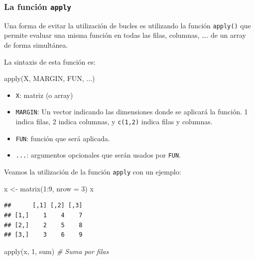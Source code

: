 \documentclass[
]{book}
\newenvironment{Shaded}{\begin{snugshade}}{\end{snugshade}}
\newcommand{\AttributeTok}[1]{\textcolor[rgb]{0.77,0.63,0.00}{#1}}
\newcommand{\CommentTok}[1]{\textcolor[rgb]{0.56,0.35,0.01}{\textit{#1}}}
\newcommand{\DecValTok}[1]{\textcolor[rgb]{0.00,0.00,0.81}{#1}}
\newcommand{\FunctionTok}[1]{\textcolor[rgb]{0.00,0.00,0.00}{#1}}
\newcommand{\NormalTok}[1]{#1}
\newcommand{\OtherTok}[1]{\textcolor[rgb]{0.56,0.35,0.01}{#1}}
\newcommand{\SpecialCharTok}[1]{\textcolor[rgb]{0.00,0.00,0.00}{#1}}
\providecommand{\tightlist}{%
  \setlength{\itemsep}{0pt}\setlength{\parskip}{0pt}}
\theoremstyle{break}
\begin{document}
\hypertarget{la-funciuxf3n-apply}{%
\subsubsection{\texorpdfstring{La función \texttt{apply}}{La función apply}}\label{la-funciuxf3n-apply}}

Una forma de evitar la
utilización de bucles es utilizando la función \texttt{apply()} que permite
evaluar una misma función en todas las filas, columnas, \ldots. de un array
de forma simultánea.

La sintaxis de esta función es:

\begin{Shaded}
\begin{Highlighting}[]
\FunctionTok{apply}\NormalTok{(X, MARGIN, FUN, ...)}
\end{Highlighting}
\end{Shaded}

\begin{itemize}
\tightlist
\item
  \texttt{X}: matriz (o array)
\item
  \texttt{MARGIN}: Un vector indicando las dimensiones donde se aplicará
  la función. 1 indica filas, 2 indica columnas, y \texttt{c(1,2)} indica
  filas y columnas.
\item
  \texttt{FUN}: función que será aplicada.
\item
  \texttt{...}: argumentos opcionales que serán usados por \texttt{FUN}.
\end{itemize}

Veamos la utilización de la función \texttt{apply} con un ejemplo:

\begin{Shaded}
\begin{Highlighting}[]
\NormalTok{x }\OtherTok{\textless{}{-}} \FunctionTok{matrix}\NormalTok{(}\DecValTok{1}\SpecialCharTok{:}\DecValTok{9}\NormalTok{, }\AttributeTok{nrow =} \DecValTok{3}\NormalTok{)}
\NormalTok{x}
\end{Highlighting}
\end{Shaded}

\begin{verbatim}
##      [,1] [,2] [,3]
## [1,]    1    4    7
## [2,]    2    5    8
## [3,]    3    6    9
\end{verbatim}

\begin{Shaded}
\begin{Highlighting}[]
\FunctionTok{apply}\NormalTok{(x, }\DecValTok{1}\NormalTok{, sum)    }\CommentTok{\# Suma por filas}
\end{Highlighting}
\end{Shaded}
\end{document}
